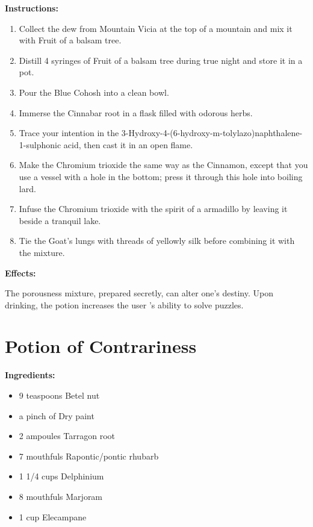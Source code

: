 \documentclass{article}
\begin{document}
\textbf{Instructions:}

\begin{enumerate}
  \item Collect the dew from Mountain Vicia at the top of a mountain and mix it with Fruit of a balsam tree.
  \item Distill 4 syringes of Fruit of a balsam tree during true night and store it in a pot.
  \item Pour the Blue Cohosh into a clean bowl.
  \item Immerse the Cinnabar root in a flask filled with odorous herbs.
  \item Trace your intention in the 3-Hydroxy-4-(6-hydroxy-m-tolylazo)naphthalene-1-sulphonic acid, then cast it in an open flame.
  \item Make the Chromium trioxide the same way as the Cinnamon, except that you use a vessel with a hole in the bottom; press it through this hole into boiling lard.
  \item Infuse the Chromium trioxide with the spirit of a armadillo by leaving it beside a tranquil lake.
  \item Tie the Goat's lungs with threads of yellowly silk before combining it with the mixture.
\end{enumerate}

\textbf{Effects:}

The porousness mixture, prepared secretly, can alter one's destiny. Upon drinking, the potion increases the user 's ability to solve puzzles.

\newpage
\section*{Potion of Contrariness}

\textbf{Ingredients:}

\begin{itemize}
  \item 9 teaspoons Betel nut
  \item a pinch of Dry paint
  \item 2 ampoules Tarragon root
  \item 7 mouthfuls Rapontic/pontic rhubarb
  \item 1 1/4 cups Delphinium
  \item 8 mouthfuls Marjoram
  \item 1 cup Elecampane
\end{itemize}
\end{document}
